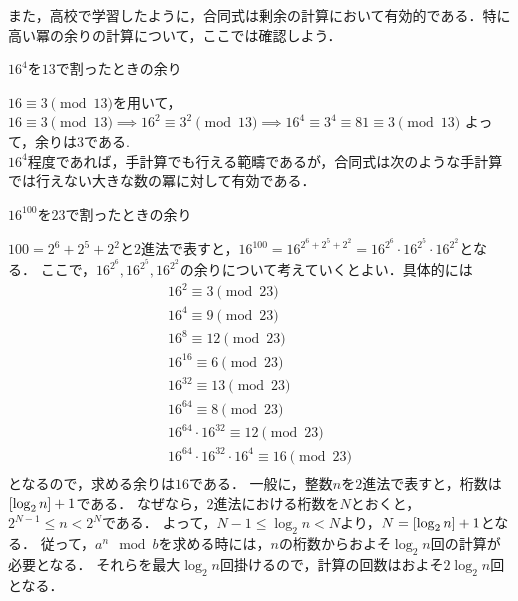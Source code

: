     また，高校で学習したように，合同式は剰余の計算において有効的である．特に高い冪の余りの計算について，ここでは確認しよう．

    \begin{ex}
      $16^4$を$13$で割ったときの余り
    \end{ex}

    $16 \equiv 3 \pmod {13}$を用いて，$16 \equiv 3 \pmod {13} \implies 16^2 \equiv 3^2 \pmod {13} \implies 16^4 \equiv 3^4 \equiv 81 \equiv 3 \pmod {13}$
    よって，余りは$3$である.\\

    $16^4$程度であれば，手計算でも行える範疇であるが，合同式は次のような手計算では行えない大きな数の冪に対して有効である．

    \begin{ex}
      $16^{100}$を$23$で割ったときの余り
    \end{ex}

    $100 = 2^6 + 2^5 + 2^2$と$2$進法で表すと，$16^{100} = 16^{2^6 + 2^5 + 2^2} = 16^{2^6} \cdot 16^{2^5} \cdot 16^{2^2}$となる．
    ここで，$16^{2^6}, 16^{2^5}, 16^{2^2}$の余りについて考えていくとよい．具体的には
    \begin{gather}
      16^2 \equiv 3 \pmod {23} \nonumber \\
      16^4 \equiv 9 \pmod {23} \nonumber \\
      16^8 \equiv 12 \pmod {23} \nonumber \\
      16^{16} \equiv 6 \pmod {23} \nonumber \\
      16^{32} \equiv 13 \pmod {23} \nonumber \\
      16^{64} \equiv 8 \pmod {23} \nonumber \\
      16^{64} \cdot 16^{32} \equiv 12 \pmod {23} \nonumber \\
      16^{64} \cdot 16^{32} \cdot 16^4 \equiv 16 \pmod {23} \nonumber \\
    \end{gather}
    となるので，求める余りは$16$である．
    一般に，整数$n$を$2$進法で表すと，桁数は$\lbrack\log_2 n\rbrack+1$である．
    なぜなら，$2$進法における桁数を$N$とおくと，$2^{N-1} \leq n < 2^N$である．
    よって，$N-1 \leq \log_2 n < N$より，$N = \lbrack\log_2 n\rbrack+1$となる．
    従って，$a^n \mod b$を求める時には，$n$の桁数からおよそ$\log_2 n$回の計算が必要となる．
    それらを最大$\log_2 n$回掛けるので，計算の回数はおよそ$2\log_2 n$回となる．


% 